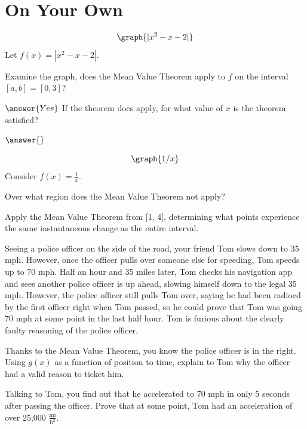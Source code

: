 \documentclass{ximera}
\begin{document}
\section{On Your Own}
\[
\graph{|x^2-x-2|}
\]
Let $f(x)=\left|x^2-x-2\right|$.
\begin{question}
Examine the graph, does the Mean Value Theorem apply to $f$ on the interval $[a,b]=[0,3]$?

$\answer{Yes}$
If the theorem does apply, for what value of $x$ is the theorem satisfied?

$\answer{}$
\end{question}
\begin{question}
\[
\graph{1/x}
\]
Consider $f(x) = \frac{1}{x}$.

Over what region does the Mean Value Theorem not apply?

\begin{freeResponse}
\end{freeResponse}

Apply the Mean Value Theorem from [1, 4], determining what points experience the same instantaneous change as the entire interval.
\begin{freeResponse}
\end{freeResponse}
\end{question}
\begin{question}
Seeing a police officer on the side of the road, your friend Tom slows down to 35 mph. However, once the officer pulls over someone else for speeding, Tom speeds up to 70 mph. Half an hour and 35 miles later, Tom checks his navigation app and sees another police officer is up ahead, slowing himself down to the legal 35 mph. However, the police officer still pulls Tom over, saying he had been radioed by the first officer right when Tom passed, so he could prove that Tom was going 70 mph at some point in the last half hour. Tom is furious about the clearly faulty reasoning of the police officer.

Thanks to the Mean Value Theorem, you know the police officer is in the right. Using $g(x)$ as a function of position to time, explain to Tom why the officer had a valid reason to ticket him.

\begin{freeResponse}
\end{freeResponse}

Talking to Tom, you find out that he accelerated to 70 mph in only 5 seconds after passing the officer. Prove that at some point, Tom had an acceleration of over 25,000 $\frac{\text{mi}}{\text{h}^2}$.

\begin{freeResponse}
\end{freeResponse}
\end{question}
\end{document}
